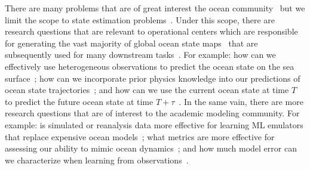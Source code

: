 



There are many problems that are of great interest the ocean community~\citep{ML4DA} but we limit the scope to state estimation problems~\citep{DAGEOSCIENCE}. Under this scope, there are research questions that are relevant to operational centers which are responsible for generating the vast majority of global ocean state maps~\citep{MDSOCEANPHYSICS,MDSOCEANPHYSICSENS,MDSBIOGEOCHEMICAL, MDSWAVES} that are subsequently used for many downstream tasks~\citep{ML4OCN}. For example: how can we effectively use heterogeneous observations to predict the ocean state on the sea surface~\citep{BFNQG,NERFSSSH,MIOST,4DVARNETSST,4DVARNETSWOT,OCEANSATELLITESST}; how can we incorporate prior physics knowledge into our predictions of ocean state trajectories~\citep{BFNQG,ML4DA,ML4OCN}; and how can we use the current ocean state at time $T$ to predict the future ocean state at time $T+\tau$~\citep{METNET2,weatherbench,FORECASTSSCGP}.
In the same vain, there are more research questions that are of interest to the academic modeling community. For example: is simulated or reanalysis data more effective for learning ML emulators that replace expensive ocean models~\citep{MLSUBGRID,MLCLOSURE}; what metrics are more effective for assessing our ability to mimic ocean dynamics~\citep{SSTFLOWANOMALY,MLMETRICSINVARIANCE}; and how much model error can we characterize when learning from observations~\citep{MLMODELERR,MLMODELERR2}. 


